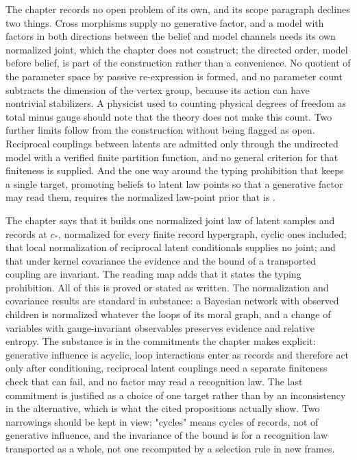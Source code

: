 The chapter records no open problem of its own, and its scope paragraph declines two things. Cross morphisms
supply no generative factor, and a model with factors in both directions between the belief and model channels
needs its own normalized joint, which the chapter does not construct; the directed order, model before belief, is
part of the construction rather than a convenience. No quotient of the parameter space by passive re-expression is
formed, and no parameter count subtracts the dimension of the vertex group, because its action can have
nontrivial stabilizers. A physicist used to counting physical degrees of freedom as total minus gauge should note
that the theory does not make this count. Two further limits follow from the construction without being flagged
as open. Reciprocal couplings between latents are admitted only through the undirected model with a verified
finite partition function, and no general criterion for that finiteness is supplied. And the one way around the
typing prohibition that keeps a single target, promoting beliefs to latent law points so that a generative factor
may read them, requires the normalized law-point prior that is .

\begin{verdictbox}{\DELIVERED}
The chapter says that it builds one normalized joint law of latent samples and records at $c_*$, normalized for
every finite record hypergraph, cyclic ones included; that local normalization of reciprocal latent conditionals
supplies no joint; and that under kernel covariance the evidence and the bound of a transported coupling are
invariant. The reading map adds that it states the typing prohibition. All of this is proved or stated as written.
The normalization and covariance results are standard in substance: a Bayesian network with observed children is
normalized whatever the loops of its moral graph, and a change of variables with gauge-invariant observables
preserves evidence and relative entropy. The substance is in the commitments the chapter makes explicit:
generative influence is acyclic, loop interactions enter as records and therefore act only after conditioning,
reciprocal latent couplings need a separate finiteness check that can fail, and no factor may read a recognition
law. The last commitment is justified as a choice of one target rather than by an inconsistency in the
alternative, which is what the cited propositions actually show. Two narrowings should be kept in view: "cycles"
means cycles of records, not of generative influence, and the invariance of the bound is for a recognition law
transported as a whole, not one recomputed by a selection rule in new frames.
\end{verdictbox}
